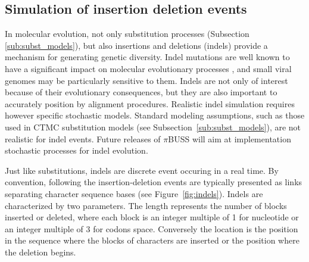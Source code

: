 \subsection{Simulation of insertion deletion events}

In molecular evolution, not only substitution processes (Subsection \ref{sub:subst_models}), but also insertions and deletions (indels) provide a mechanism for generating genetic diversity.
Indel mutations are well known to have a significant impact on molecular evolutionary processes \citep{Fletcher2009}, and small viral genomes may be particularly sensitive to them.
Indels are not only of interest because of their evolutionary consequences, but they are also important to accurately position by alignment procedures.
Realistic indel simulation requires however specific stochastic models.
Standard modeling assumptions, such as those used in CTMC substitution models (see Subsection~\ref{sub:subst_models}), are not realistic for indel events. %
Future releases of $\pi$BUSS will aim at implementation stochastic processes for indel evolution.

Just like substitutions, indels are discrete event occuring in a real time.
By convention, following \cite{Thorne1991} the insertion-deletion events are typically presented as links separating character sequence bases (see Figure~\ref{fig:indels}).
Indels are characterized by two parameters.
The length represents the number of blocks inserted or deleted, where each block is an integer multiple of 1 for nucleotide or an integer multiple of 3 for codons space. 
Conversely the location is the position in the sequence where the blocks of characters are inserted or the position where the deletion begins.


